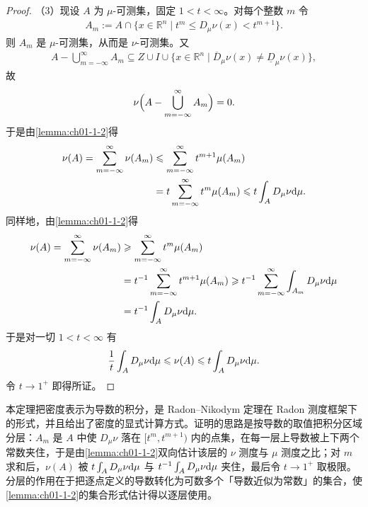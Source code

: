 \documentclass[../../main.tex]{subfiles}%
\begin{document}
\begin{proof}
（3）现设 $A$ 为 $\mu$-可测集，固定 $1<t<\infty$。对每个整数 $m$ 令
\begin{align*}
A_m:=A\cap\{x\in\mathbb{R}^n\mid t^m\leqslant D_{\mu}\nu(x)<t^{m+1}\}.
\end{align*}
则 $A_m$ 是 $\mu$-可测集，从而是 $\nu$-可测集。又
\begin{align*}
A-\bigcup_{m=-\infty}^{\infty}A_m\subseteq Z\cup I\cup\{x\in\mathbb{R}^n\mid\overline{D}_{\mu}\nu(x)\neq\underline{D}_{\mu}\nu(x)\},
\end{align*}
故
\begin{align*}
\nu\Bigl(A-\bigcup_{m=-\infty}^{\infty}A_m\Bigr)=0 .
\end{align*}
于是由\cref{lemma:ch01-1-2}得%
\begin{align*}
\nu(A)=\sum_{m=-\infty}^{\infty}\nu(A_m)
&\leqslant\sum_{m=-\infty}^{\infty}t^{m+1}\mu(A_m)\\
&=t\sum_{m=-\infty}^{\infty}t^{m}\mu(A_m)\leqslant t\int_A D_{\mu}\nu\mathrm{d}\mu .
\end{align*}
同样地，由\cref{lemma:ch01-1-2}得%
\begin{align*}
\nu(A)=\sum_{m=-\infty}^{\infty}\nu(A_m)
&\geqslant\sum_{m=-\infty}^{\infty}t^{m}\mu(A_m)\\
&=t^{-1}\sum_{m=-\infty}^{\infty}t^{m+1}\mu(A_m)
\geqslant t^{-1}\sum_{m=-\infty}^{\infty}\int_{A_m}D_{\mu}\nu\mathrm{d}\mu\\
&=t^{-1}\int_A D_{\mu}\nu\mathrm{d}\mu .
\end{align*}
于是对一切 $1<t<\infty$ 有
\begin{align*}
\frac{1}{t}\int_A D_{\mu}\nu\mathrm{d}\mu\leqslant\nu(A)\leqslant t\int_A D_{\mu}\nu\mathrm{d}\mu .
\end{align*}
令 $t\to1^{+}$ 即得所证。
\end{proof}

\begin{remark}\label{remark:ch01-thm-1-30-动机}
本定理把密度表示为导数的积分，是 Radon--Nikodym 定理在 Radon 测度框架下的形式，并且给出了密度的显式计算方式。证明的思路是按导数的取值把积分区域分层：$A_m$ 是 $A$ 中使 $D_{\mu}\nu$ 落在 $[t^m,t^{m+1})$ 内的点集，在每一层上导数被上下两个常数夹住，于是由\cref{lemma:ch01-1-2}双向估计该层的 $\nu$ 测度与 $\mu$ 测度之比；对 $m$ 求和后，$\nu(A)$ 被 $t\int_A D_{\mu}\nu\mathrm{d}\mu$ 与 $t^{-1}\int_A D_{\mu}\nu\mathrm{d}\mu$ 夹住，最后令 $t\to1^{+}$ 取极限。分层的作用在于把逐点定义的导数转化为可数多个「导数近似为常数」的集合，使\cref{lemma:ch01-1-2}的集合形式估计得以逐层使用。%
\end{remark}
\end{document}
